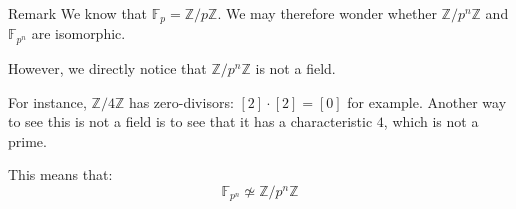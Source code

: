 \documentclass[a4paper]{article}
\begin{document}
\begin{parag}{Remark}
    We know that $\mathbb{F}_p = \mathbb{Z}/p\mathbb{Z}$. We may therefore wonder whether $\mathbb{Z}/p^n\mathbb{Z}$ and $\mathbb{F}_{p^n}$ are isomorphic.

    However, we directly notice that $\mathbb{Z}/p^n\mathbb{Z}$ is not a field.

    For instance, $\mathbb{Z}/4\mathbb{Z}$ has zero-divisors: $\left[2\right]\cdot \left[2\right] = \left[0\right]$ for example. Another way to see this is not a field is to see that it has a characteristic $4$, which is not a prime.

    This means that:
    \[\mathbb{F}_{p^n} \not\simeq \mathbb{Z}/p^n\mathbb{Z}\]
\end{parag}
\end{document}
